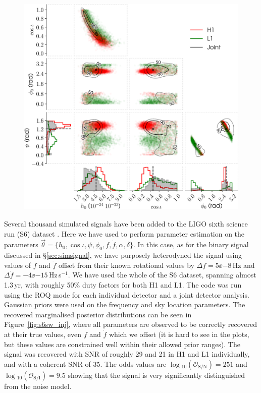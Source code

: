 \begin{figure}[!phtb]
\begin{center}
\includegraphics[width=1\columnwidth]{./figures/codeeval/simulations/S6_hwinj/hwinj05/hwinj05}
\caption{ \protect}
\end{center}
\end{figure}

Several thousand simulated signals have been added to the LIGO sixth science run (S6) dataset \citep[see Section~IV of][]{2016PhRvD..94l4010W}.
Here we have used \lppen to perform parameter estimation on the parameters $\vec{\theta} = \{h_0, \cos{\iota}, \psi, \phi_{0}, f, \dot{f}, \alpha, \delta\}$.
In this case, as for the binary signal discussed in \S\ref{sec:simsignal}, we have purposely heterodyned the signal using values of $f$ and $\dot{f}$ offset
from their known rotational values by $\Delta f = 5\ee{-8}$\,Hz and $\Delta \dot{f} = -4\ee{-15}$\,Hz\,s$^{-1}$. We have used the whole of the S6 dataset,
spanning almost 1.3\,yr, with roughly 50\% duty factors for both H1 and L1. The code was run using the ROQ mode for each individual detector and a joint
detector analysis. Gaussian priors were used on the frequency and sky location parameters. The recovered marginalised posterior distributions can be seen
in Figure~\ref{fig:s6sw_inj}, where all parameters are observed to be correctly recovered at their true values, even $f$ and $\dot{f}$ which we offset (it is
hard to see in the plots, but these values are constrained well within their allowed prior ranges). The signal was recovered with SNR of roughly 29 and 21 in
H1 and L1 individually, and with a coherent SNR of 35. The odds values are $\log{}_{10}\left(\mathcal{O}_{\text{S}/\text{N}}\right) = 251$ and $\log{}_{10}\left(\mathcal{O}_{\text{S}/\text{I}}\right) = 9.5$ showing that the signal is very significantly distinguished from the noise model.

